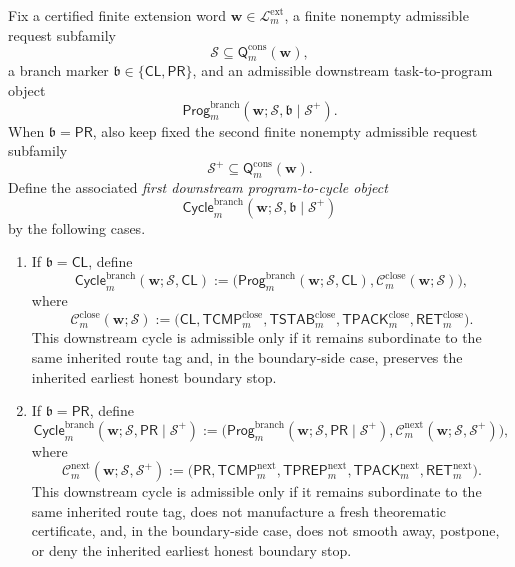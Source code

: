 \begin{definition}
\label{def:first-downstream-program-to-cycle-object}
Fix a certified finite extension word \(\mathbf w\in\mathcal L^{\mathrm{ext}}_{m}\), a finite nonempty admissible request subfamily
\[
  \mathcal S \subseteq \mathsf{Q}^{\mathrm{cons}}_{m}(\mathbf w),
\]
a branch marker \(\mathfrak b\in\{\mathsf{CL},\mathsf{PR}\}\), and an admissible downstream task-to-program object
\[
  \mathsf{Prog}^{\mathrm{branch}}_{m}(\mathbf w;\mathcal S,\mathfrak b\mid\mathcal S^{+}).
\]
When \(\mathfrak b=\mathsf{PR}\), also keep fixed the second finite nonempty admissible request subfamily
\[
  \mathcal S^{+}\subseteq \mathsf{Q}^{\mathrm{cons}}_{m}(\mathbf w).
\]
Define the associated \emph{first downstream program-to-cycle object}
\[
  \mathsf{Cycle}^{\mathrm{branch}}_{m}(\mathbf w;\mathcal S,\mathfrak b\mid\mathcal S^{+})
\]
by the following cases.
\begin{enumerate}[label=(\roman*)]
  \item If \(\mathfrak b=\mathsf{CL}\), define
\[
  \mathsf{Cycle}^{\mathrm{branch}}_{m}(\mathbf w;\mathcal S,\mathsf{CL})
  :=
  \bigl(\mathsf{Prog}^{\mathrm{branch}}_{m}(\mathbf w;\mathcal S,\mathsf{CL}),\mathcal C^{\mathrm{close}}_{m}(\mathbf w;\mathcal S)\bigr),
\]
where
\[
  \mathcal C^{\mathrm{close}}_{m}(\mathbf w;\mathcal S)
  :=
  \bigl(\mathsf{CL},\mathsf{TCMP}^{\mathrm{close}}_{m},\mathsf{TSTAB}^{\mathrm{close}}_{m},\mathsf{TPACK}^{\mathrm{close}}_{m},\mathsf{RET}^{\mathrm{close}}_{m}\bigr).
\]
This downstream cycle is admissible only if it remains subordinate to the same inherited route tag and, in the boundary-side case, preserves the inherited earliest honest boundary stop.

  \item If \(\mathfrak b=\mathsf{PR}\), define
\[
  \mathsf{Cycle}^{\mathrm{branch}}_{m}(\mathbf w;\mathcal S,\mathsf{PR}\mid\mathcal S^{+})
  :=
  \bigl(\mathsf{Prog}^{\mathrm{branch}}_{m}(\mathbf w;\mathcal S,\mathsf{PR}\mid\mathcal S^{+}),\mathcal C^{\mathrm{next}}_{m}(\mathbf w;\mathcal S,\mathcal S^{+})\bigr),
\]
where
\[
  \mathcal C^{\mathrm{next}}_{m}(\mathbf w;\mathcal S,\mathcal S^{+})
  :=
  \bigl(\mathsf{PR},\mathsf{TCMP}^{\mathrm{next}}_{m},\mathsf{TPREP}^{\mathrm{next}}_{m},\mathsf{TPACK}^{\mathrm{next}}_{m},\mathsf{RET}^{\mathrm{next}}_{m}\bigr).
\]
This downstream cycle is admissible only if it remains subordinate to the same inherited route tag, does not manufacture a fresh theorematic certificate, and, in the boundary-side case, does not smooth away, postpone, or deny the inherited earliest honest boundary stop.
\end{enumerate}
\end{definition}

